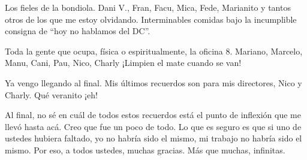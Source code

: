 Los fieles de la bondiola. Dani V., Fran, Facu, Mica, Fede, Marianito y tantos otros de los que me estoy olvidando. Interminables comidas bajo la incumplible consigna de ``hoy no hablamos del DC''.

Toda la gente que ocupa, física o espiritualmente, la oficina 8. Mariano, Marcelo, Manu, Cani, Pau, Nico, Charly ¡Limpien el mate cuando se van!

Ya vengo llegando al final. Mis últimos recuerdos son para mis directores, Nico y Charly. Qué veranito ¡eh!

Al final, no sé en cuál de todos estos recuerdos está el punto de inflexión que me llevó hasta acá. Creo que fue un poco de todo. Lo que es seguro es que si uno de ustedes hubiera faltado, yo no habría sido el mismo, mi trabajo no habría sido el mismo. Por eso, a todos ustedes, muchas gracias. Más que muchas, infinitas.